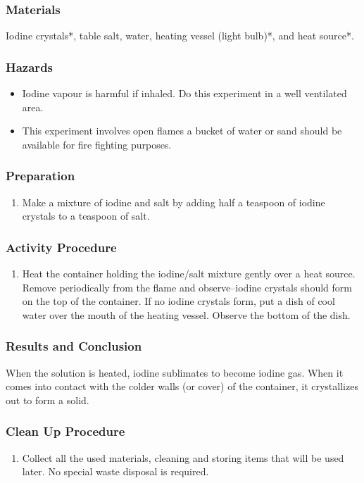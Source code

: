\subsubsection*{Materials}
Iodine crystals*, table salt, water, heating vessel (light bulb)*, and heat source*.
\subsubsection*{Hazards}
\begin{itemize}
\item Iodine vapour is harmful if inhaled. Do this experiment in a well ventilated area.
\item This experiment involves open flames a bucket of water or sand should be available for fire fighting purposes.
\end{itemize}

\subsubsection*{Preparation}
\begin{enumerate}
\item{Make a mixture of iodine and salt by adding half a teaspoon of iodine crystals to a teaspoon of salt.}
\end{enumerate}

\subsubsection*{Activity Procedure}
\begin{enumerate}
\item{Heat the container holding the iodine/salt mixture gently over a heat source. Remove periodically from the flame and observe--iodine crystals should form on the top of the container. If no iodine crystals form, put a dish of cool water over the mouth of the heating vessel. Observe the bottom of the dish. }
\end{enumerate}

\subsubsection*{Results and Conclusion}
When the solution is heated, iodine sublimates to become iodine gas. When it comes into contact with the colder walls (or cover) of the container, it crystallizes out to form a solid.

\subsubsection*{Clean Up Procedure}
\begin{enumerate}
\item{Collect all the used materials, cleaning and storing items that will be used later. No special waste disposal is required.}
\end{enumerate}



